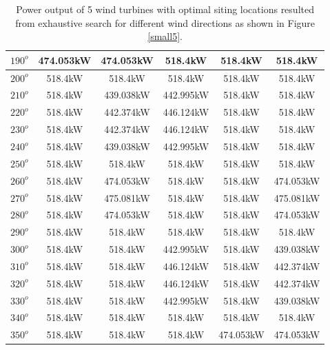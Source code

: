 \begin{table}[H]
\begin{tabular}{|c|c|c|c|c|c|}
        		$190^o$	& 474.053kW	& 474.053kW	& 518.4kW	& 518.4kW	& 518.4kW	\\ \hline
        		$200^o$	& 518.4kW	& 518.4kW	& 518.4kW	& 518.4kW	& 518.4kW	\\ \hline
        		$210^o$	& 518.4kW	& 439.038kW	& 442.995kW	& 518.4kW	& 518.4kW	\\ \hline
        		$220^o$	& 518.4kW	& 442.374kW	& 446.124kW	& 518.4kW	& 518.4kW	\\ \hline
        		$230^o$	& 518.4kW	& 442.374kW	& 446.124kW	& 518.4kW	& 518.4kW	\\ \hline
        		$240^o$	& 518.4kW	& 439.038kW	& 442.995kW	& 518.4kW	& 518.4kW	\\ \hline
        		$250^o$	& 518.4kW	& 518.4kW	& 518.4kW	& 518.4kW	& 518.4kW	\\ \hline
        		$260^o$	& 518.4kW	& 474.053kW	& 518.4kW	& 518.4kW	& 474.053kW	\\ \hline
        		$270^o$	& 518.4kW	& 475.081kW	& 518.4kW	& 518.4kW	& 475.081kW	\\ \hline
        		$280^o$	& 518.4kW	& 474.053kW	& 518.4kW	& 518.4kW	& 474.053kW	\\ \hline
        		$290^o$	& 518.4kW	& 518.4kW	& 518.4kW	& 518.4kW	& 518.4kW	\\ \hline
        		$300^o$	& 518.4kW	& 518.4kW	& 442.995kW	& 518.4kW	& 439.038kW	\\ \hline
        		$310^o$	& 518.4kW	& 518.4kW	& 446.124kW	& 518.4kW	& 442.374kW	\\ \hline
        		$320^o$	& 518.4kW	& 518.4kW	& 446.124kW	& 518.4kW	& 442.374kW	\\ \hline
        		$330^o$	& 518.4kW	& 518.4kW	& 442.995kW	& 518.4kW	& 439.038kW	\\ \hline
        		$340^o$	& 518.4kW	& 518.4kW	& 518.4kW	& 518.4kW	& 518.4kW	\\ \hline
        		$350^o$	& 518.4kW	& 518.4kW	& 518.4kW	& 474.053kW	& 474.053kW	\\ \hline
        	\end{tabular}
        	\caption{Power output of 5 wind turbines with optimal siting locations resulted from exhaustive search for different wind directions as shown in Figure \ref{small5}.}
        	\label{table5}
        \end{table}
        \doublespacing
        
